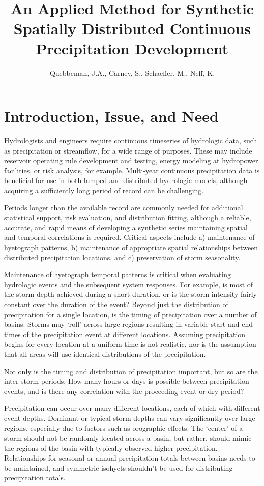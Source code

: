 \documentclass[11pt]{article} %
\title{An Applied Method for Synthetic Spatially Distributed Continuous Precipitation Development}
\author{Quebbeman, J.A., Carney, S., Schaeffer, M., Neff, K.}
\begin{document}
\maketitle

\section{Introduction, Issue, and Need}

Hydrologists and engineers require continuous timeseries of hydrologic data, such as precipitation or streamflow, for a wide range of purposes. These may include reservoir operating rule development and testing, energy modeling at hydropower facilities, or risk analysis, for example. Multi-year continuous precipitation data is beneficial for use in both lumped and distributed hydrologic models, although acquiring a sufficiently long period of record can be challenging.

Periods longer than the available record are commonly needed for additional statistical support, risk evaluation, and distribution fitting, although a reliable, accurate, and rapid means of developing a synthetic series maintaining spatial and temporal correlations is required. Critical aspects include a) maintenance of hyetograph patterns, b) maintenance of appropriate spatial relationships between distributed precipitation locations, and c) preservation of storm seasonality.

Maintenance of hyetograph temporal patterns is critical when evaluating hydrologic events and the subsequent system responses. For example, is most of the storm depth achieved during a short duration, or is the storm intensity fairly constant over the duration of the event?  Beyond just the distribution of precipitation for a single location, is the timing of precipitation over a number of basins. Storms may ‘roll’ across large regions resulting in variable start and end-times of the precipitation event at different locations. Assuming precipitation begins for every location at a uniform time is not realistic, nor is the assumption that all areas will use identical distributions of the precipitation.

Not only is the timing and distribution of precipitation important, but so are the inter-storm periods. How many hours or days is possible between precipitation events, and is there any correlation with the proceeding event or dry period?

Precipitation can occur over many different locations, each of which with different event depths. Dominant or typical storm depths can vary significantly over large regions, especially due to factors such as orographic effects. The ‘center’ of a storm should not be randomly located across a basin, but rather, should mimic the regions of the basin with typically observed higher precipitation. Relationships for seasonal or annual precipitation totals between basins needs to be maintained, and symmetric isohyets shouldn't be used for distributing precipitation totals.
	
\end{document}
